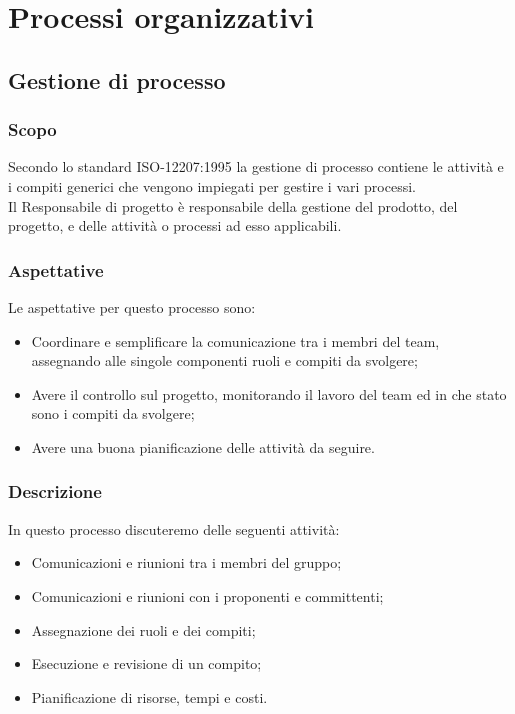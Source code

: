 \section{Processi organizzativi}

\subsection{Gestione di processo} \label{_gestioneDiProcesso}

\subsubsection{Scopo}
Secondo lo standard ISO-12207:1995 la gestione di processo contiene le attività e i compiti generici che vengono impiegati per gestire i vari processi.\\
Il Responsabile di progetto è responsabile della gestione del prodotto, del progetto, e delle attività o processi ad esso applicabili.
\subsubsection{Aspettative}
Le aspettative per questo processo sono:
\begin{itemize}
    \item Coordinare e semplificare la comunicazione tra i membri del team, assegnando alle singole componenti ruoli e compiti da svolgere;
    \item Avere il controllo sul progetto, monitorando il lavoro del team ed in che stato sono i compiti da svolgere;
    \item Avere una buona pianificazione delle attività da seguire.
\end{itemize}

\subsubsection{Descrizione}
In questo processo discuteremo delle seguenti attività:
\begin{itemize}
    \item Comunicazioni e riunioni tra i membri del gruppo;
    \item Comunicazioni e riunioni con i proponenti e committenti;
    \item Assegnazione dei ruoli e dei compiti;
    \item Esecuzione e revisione di un compito;
    \item Pianificazione di risorse, tempi e costi.
\end{itemize}

